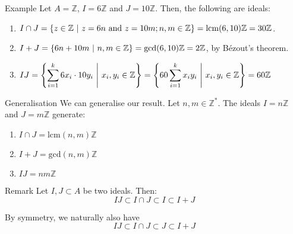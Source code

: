 \documentclass[a4paper]{article}
\begin{document}
\begin{parag}{Example}
    Let $A = \mathbb{Z}$, $I = 6\mathbb{Z}$ and $J = 10\mathbb{Z}$. Then, the following are ideals:
    \begin{enumerate}
        \item $\displaystyle I \cap J = \left\{z \in \mathbb{Z} \suchthat z = 6n \text{ and } z = 10m; n, m \in \mathbb{Z}\right\} = \lcm\left(6, 10\right)\mathbb{Z} = 30 \mathbb{Z}$.
        \item $\displaystyle I + J = \left\{6n + 10m \suchthat n, m \in \mathbb{Z}\right\} = \text{gcd}\left(6, 10\right)\mathbb{Z} = 2\mathbb{Z}$, by Bézout's theorem.
        \item $\displaystyle IJ = \left\{\sum_{i=1}^{k} 6x_i\cdot 10y_i \suchthat x_i, y_i \in \mathbb{Z}\right\} = \left\{60 \sum_{i=1}^{k} x_i y_i \suchthat x_i, y_i \in \mathbb{Z}\right\} = 60 \mathbb{Z}$
    \end{enumerate}

    \begin{subparag}{Generalisation}
        We can generalise our result. Let $n, m \in \mathbb{Z}^*$. The ideals $I = n\mathbb{Z}$ and $J = m\mathbb{Z}$ generate:
        \begin{enumerate}
            \item $I \cap J = \text{lcm}\left(n, m\right)\mathbb{Z}$
            \item $I + J = \text{gcd}\left(n, m\right)\mathbb{Z}$
            \item $IJ = nm\mathbb{Z}$
        \end{enumerate}
    \end{subparag}
\end{parag}

\begin{parag}{Remark}
    Let $I, J \subset A$ be two ideals. Then: 
    \[IJ \subset I \cap J \subset I \subset I + J\]
    
    By symmetry, we naturally also have 
    \[IJ \subset I \cap J \subset J \subset I + J\]
\end{parag}
\end{document}
